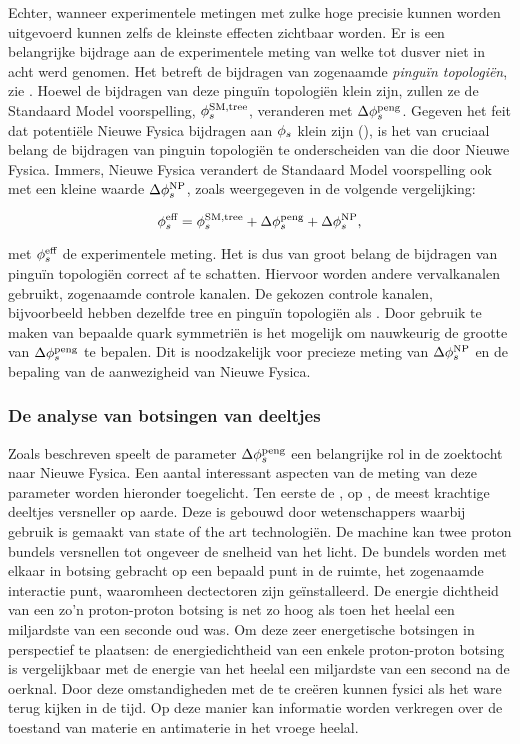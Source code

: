 Echter, wanneer experimentele metingen met zulke hoge precisie kunnen worden uitgevoerd
kunnen zelfs de kleinste effecten zichtbaar worden. Er is een belangrijke bijdrage aan de
experimentele meting van \phis welke tot dusver niet in acht werd genomen. Het betreft de
bijdragen van zogenaamde {\it pingu\"in topologi\"en}, zie  .
Hoewel de bijdragen van deze pingu\"in topologi\"en klein zijn, zullen ze de Standaard Model
voorspelling, $\phi_{s}^{\tiny \text{SM,tree}}$, veranderen met $\Delta\phi_{s}^{\tiny\text{peng}}$. Gegeven het
feit dat potenti\"ele Nieuwe Fysica bijdragen aan $\phi_{s}$ klein zijn (),
is het van cruciaal belang de bijdragen van pinguin topologi\"en te onderscheiden van die door Nieuwe Fysica.
Immers, Nieuwe Fysica verandert de Standaard Model voorspelling ook met een kleine waarde
 $\Delta\phi_{s}^{\tiny \text{NP}}$, zoals weergegeven in de volgende vergelijking:

\begin{equation}
\centering
 \phis^{\text {eff}} = \phis^{\tiny \text{SM,tree}} + \Delta\phiS{peng} + \Delta\phis^{\tiny \text{NP}},
 \label{app_nl_phis_sm_peng}
\end{equation}

\noindent met $\phi_{s}^{\text {eff}}$ de experimentele \phis meting. Het is dus van groot belang de
bijdragen van pingu\"in topologi\"en correct af te schatten. Hiervoor worden andere \Bs vervalkanalen gebruikt,
zogenaamde controle kanalen. De gekozen controle kanalen, bijvoorbeeld \BsJpsiKst hebben dezelfde tree en
pingu\"in topologi\"en als \BsJpsiPhi. Door gebruik te maken van bepaalde quark symmetri\"en is het
mogelijk om nauwkeurig de grootte van $\Delta\phi_{s}^{\tiny\text{peng}}$ te bepalen. Dit is noodzakelijk voor precieze
meting van $\Delta\phi_{s}^{\tiny \text{NP}}$ en de bepaling van de aanwezigheid van Nieuwe Fysica.

\subsubsection{De analyse van botsingen van deeltjes}
Zoals beschreven speelt de parameter $\Delta\phi_{s}^{\tiny\text{peng}}$ een belangrijke rol in de zoektocht naar Nieuwe Fysica.
Een aantal interessant aspecten van de meting van deze parameter worden hieronder toegelicht. Ten eerste de \lhc, op \cern,
de meest krachtige deeltjes versneller op aarde. Deze is gebouwd door wetenschappers waarbij gebruik is gemaakt van state
of the art technologi\"en. De machine kan twee proton bundels versnellen tot ongeveer de snelheid van het licht.
De bundels worden met elkaar in botsing gebracht op een bepaald punt in de ruimte, het zogenaamde interactie punt,
waaromheen dectectoren zijn ge\"installeerd. De energie dichtheid van een zo'n proton-proton botsing is net zo hoog
als toen het heelal een miljardste van een seconde oud was. Om deze zeer energetische botsingen in perspectief te plaatsen:
de energiedichtheid van een enkele proton-proton botsing is vergelijkbaar met de energie van het heelal een miljardste van
een second na de oerknal. Door deze omstandigheden met de \lhc te cre\"eren kunnen fysici als het ware terug kijken in de tijd.
Op deze manier kan informatie worden verkregen over de toestand van materie en antimaterie in het vroege heelal.

